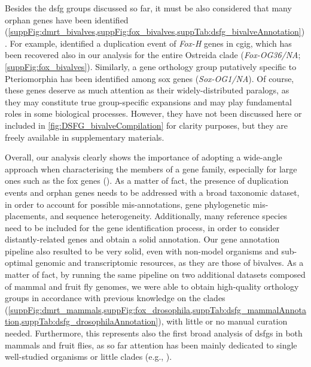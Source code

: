 Besides the \gls{dsfg} groups discussed so far, it must be also considered that many orphan genes have been identified (\cref{suppFig:dmrt_bivalves,suppFig:fox_bivalves,suppTab:dsfg_bivalveAnnotation}). For example,  identified a duplication event of \textit{Fox-H} genes in \gls{cgig}, which has been recovered also in our analysis for the entire Ostreida clade (\textit{Fox-OG36/NA}; \cref{suppFig:fox_bivalves}). Similarly, a gene orthology group putatively specific to Pteriomorphia has been identified among \gls{sox} genes (\textit{Sox-OG1/NA}). Of course, these genes deserve as much attention as their widely-distributed paralogs, as they may constitute true group-specific expansions and may play fundamental roles in some biological processes. However, they have not been discussed here or included in \cref{fig:DSFG_bivalveCompilation} for clarity purposes, but they are freely available in supplementary materials.

Overall, our analysis clearly shows the importance of adopting a wide-angle approach when characterising the members of a gene family, especially for large ones such as the \gls{fox} genes (). As a matter of fact, the presence of duplication events and orphan genes needs to be addressed with a broad taxonomic dataset, in order to account for possible mis-annotations, gene phylogenetic mis-placements, and sequence heterogeneity. Additionally, many reference species need to be included for the gene identification process, in order to consider distantly-related genes and obtain a solid annotation. Our gene annotation pipeline also resulted to be very solid, even with non-model organisms and sub-optimal genomic and transcriptomic resources, as they are those of bivalves. As a matter of fact, by running the same pipeline on two additional datasets composed of mammal and fruit fly genomes, we were able to obtain high-quality orthology groups in accordance with previous knowledge on the clades (\cref{suppFig:dmrt_mammals,suppFig:fox_drosophila,suppTab:dsfg_mammalAnnotation,suppTab:dsfg_drosophilaAnnotation}), with little or no manual curation needed. Furthermore, this represents also the first broad analysis of \glspl{dsfg} in both mammals and fruit flies, as so far attention has been mainly dedicated to single well-studied organisms or little clades (e.g., ).

